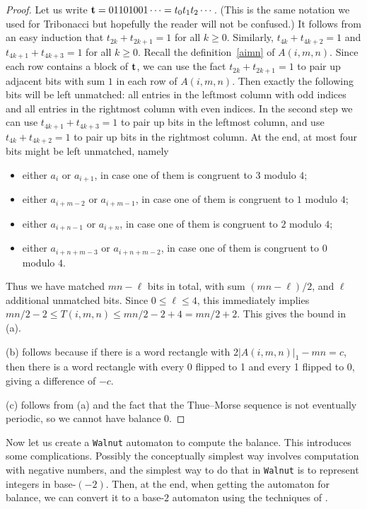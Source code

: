 \documentclass[final]{dmtcs-episciences}
\theoremstyle{plain}
\theoremstyle{remark}
\begin{document}
\begin{proof}
Let us write ${\bf t} = 01101001\cdots = t_0t_1t_2\cdots$.  (This is the same notation we used for Tribonacci but hopefully the reader will not be confused.) It follows from an easy induction that $t_{2k} + t_{2k+1} = 1$ for all $k\geq 0$. Similarly, $t_{4k} + t_{4k+2} = 1$ and $t_{4k+1} + t_{4k+3}=1$ for all $k\geq 0$. 
Recall the definition~\eqref{aimn} of $A(i,m,n)$. Since each row contains a block of ${\bf t}$, we can use the fact $t_{2k} + t_{2k+1} = 1$ to pair up adjacent bits with sum $1$ in each row of $A(i,m,n)$. Then exactly the following bits will be left unmatched: all entries in the leftmost column with odd indices and all entries in the rightmost column with even indices.
In the second step we can use $t_{4k+1} + t_{4k+3}=1$ to pair up bits in the leftmost column, and use $t_{4k} + t_{4k+2} = 1$ to pair up bits in the rightmost column.
At the end, at most four bits might be left unmatched, namely
\begin{itemize}
\item either $a_i$ or $a_{i+1}$, in case one of them is congruent to $3$ modulo $4$;
\item either $a_{i+m-2}$ or $a_{i+m-1}$, in case one of them is congruent to $1$ modulo $4$;
\item either $a_{i+n-1}$ or $a_{i+n}$, in case one of them is congruent to $2$ modulo $4$;
\item either $a_{i+n+m-3}$ or $a_{i+n+m-2}$, in case one of them is congruent to $0$ modulo $4$.
\end{itemize}
Thus we have matched $mn-\ell$ bits in total, with sum $(mn - \ell)/2$, and $\ell$ additional unmatched bits.
Since $0 \leq \ell \leq 4$,
this immediately implies $mn/2 - 2 \leq T(i,m,n) \leq mn/2 - 2 + 4 = mn/2 + 2$.
This gives the bound in (a).

(b) follows because if there is a word rectangle with $2|A(i,m,n)|_1 - mn = c$, then there is a word rectangle with every 0 flipped to 1 and every 1 flipped to 0,
giving a difference of $-c$.

(c) follows from (a) and the fact that the Thue--Morse sequence is not eventually periodic, so we cannot have balance 0.
\end{proof}

Now let us create a {\tt Walnut} automaton to compute the balance.  This introduces some complications.  Possibly  the conceptually simplest way involves computation with negative numbers, and the simplest way to do that in {\tt Walnut} is to represent integers in base-$(-2)$.  Then, at the end, when getting the automaton for balance, we
can convert it to a base-$2$
automaton using the techniques of \cite{Shallit&Shan&Yang:2023}.
\end{document}
